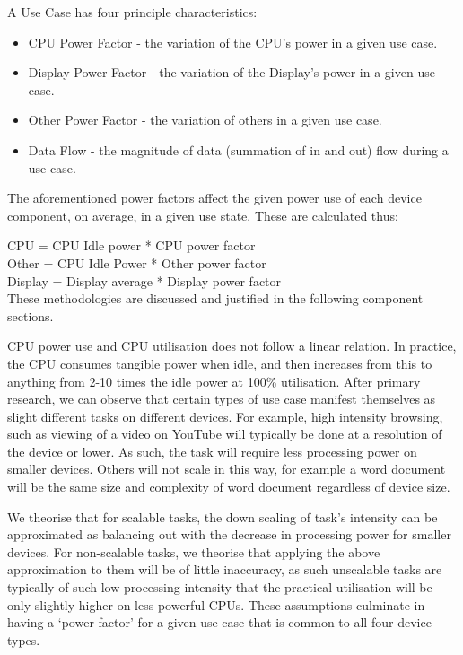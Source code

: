 \documentclass[conference]{IEEEtran}
\begin{document}

A Use Case has four principle characteristics:

\begin{itemize}
\item CPU Power Factor - the variation of the CPU’s power in a given use case.
\item Display Power Factor - the variation of the Display’s power in a given use case.
\item Other Power Factor - the variation of others in a given use case.
\item Data Flow - the magnitude of data (summation of in and out) flow during a use case.
\end{itemize}


The aforementioned power factors affect the given power use of each
device component, on average, in a given use state. These are
calculated thus:

CPU = CPU Idle power * CPU power factor\\
Other = CPU Idle Power * Other power factor\\
Display = Display average * Display power factor\\

These methodologies are discussed and justified in the following
component sections.



CPU power use and CPU utilisation does not follow a linear
relation. In practice, the CPU consumes tangible power when idle, and
then increases from this to anything from 2-10 times the idle power at
100\% utilisation.  After primary research, we can observe that
certain types of use case manifest themselves as slight different
tasks on different devices. For example, high intensity browsing, such
as viewing of a video on YouTube will typically be done at a
resolution of the device or lower. As such, the task will require less
processing power on smaller devices. Others will not scale in this
way, for example a word document will be the same size and complexity
of word document regardless of device size.

We theorise that for scalable tasks, the down scaling of task’s
intensity can be approximated as balancing out with the decrease in
processing power for smaller devices. For non-scalable tasks, we
theorise that applying the above approximation to them will be of
little inaccuracy, as such unscalable tasks are typically of such low
processing intensity that the practical utilisation will be only
slightly higher on less powerful CPUs.  These assumptions culminate in
having a `power factor' for a given use case that is common to all
four device types.
\end{document}
